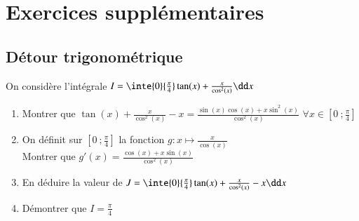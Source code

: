 \documentclass[oneside,12pt]{article}          %
\begin{document}
\section{Exercices supplémentaires}

\subsection{Détour trigonométrique}
On considère l'intégrale $I=\inte{0}{\frac{\pi}{4}}\tan(x)+\frac{x}{\cos^2(x)}\dd x$
\begin{enumerate} \setlength{\itemsep}{0pt}
    \item Montrer que $\tan(x)+\frac{x}{\cos^2(x)}-x = \frac{\sin(x)\cos(x)+x\sin^2(x)}{\cos^2(x)}$ \quad $\forall x\in\left[0~;\frac{\pi}{4}\right]$
    \item On définit sur $\left[0~;\frac{\pi}{4}\right]$ la fonction $g:x\mapsto\frac{x}{\cos(x)}$\\
    Montrer que $g'(x)=\frac{\cos(x)+x\sin(x)}{\cos^2(x)}$
    \item En déduire la valeur de $J=\inte{0}{\frac{\pi}{4}}\tan(x)+\frac{x}{\cos^2(x)}-x\dd x$
    \item Démontrer que $I=\frac{\pi}{4}$
\end{enumerate}
\end{document}
